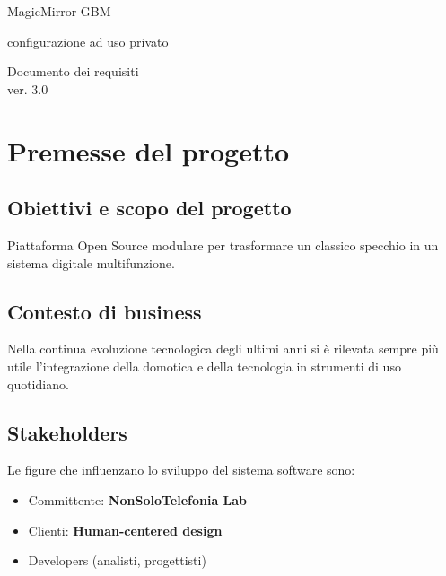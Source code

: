 \documentclass[a4paper,11pt]{article}       %
\begin{document}
\begin{titlepage}
    \centering
        \vspace*{1in}
        \begin{Large}
            MagicMirror-GBM 
            
            configurazione ad uso privato\par
        \end{Large} 
        \vspace{1.5in}
        \vfill
        Documento dei requisiti\\
        \vspace{0.1in}ver. 3.0
\end{titlepage}


\tableofcontents
\newpage


\section{Premesse del progetto}
    \subsection{Obiettivi e scopo del progetto}
        Piattaforma Open Source modulare per trasformare un classico specchio in un sistema digitale multifunzione.
    \subsection{Contesto di business}
        Nella continua evoluzione tecnologica degli ultimi anni si è rilevata sempre più utile l'integrazione della domotica e della tecnologia in strumenti di uso quotidiano.
    \subsection{Stakeholders}
        Le figure che influenzano lo sviluppo del sistema software sono:
        \begin{itemize}
            \item Committente: \textbf{NonSoloTelefonia Lab}
            \item Clienti: \textbf{\gls{Human-centered design}}
            \item Developers (analisti, progettisti)
        \end{itemize}
\end{document}
